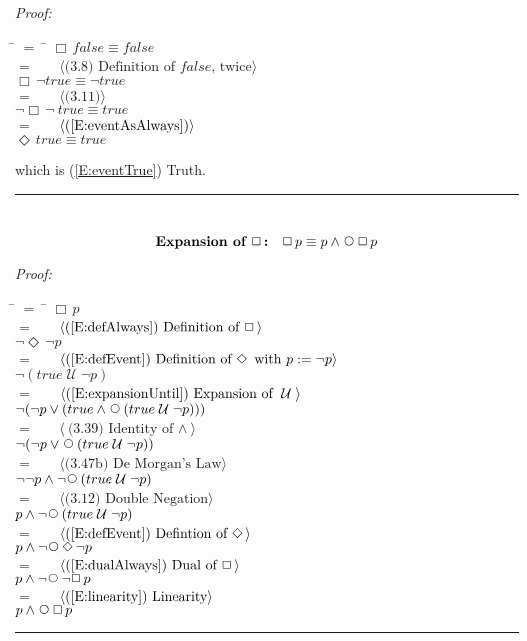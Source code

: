 \documentclass[fleqn, leqno]{article}
\newcommand{\lgap}{2pt} %
\newcommand{\mymathindent}{24pt} %
\newcommand{\Until}{\;\mathcal{U}\;}
\newcommand{\Next}{\;\,\text{\raisebox{3.5pt}{\circle{6}}}}
\newcommand{\Event}{\Diamond\,}
\newcommand{\Always}{\Box\,}
\newcommand{\myqed}{\hfill\rule[-.23ex]{1.2ex}{2.0ex}}
\newcommand{\Gll} {\langle} %
\newcommand{\Ggg} {\rangle} %
\newcommand{\Hint}[1] {\ \ \ $\Gll \mbox{#1} \Ggg$ } %
\begin{document}
\emph{Proof:}
\begin{tabbing}
\hspace{\mymathindent} \= $= \;$ \= \kill
\> \> $\Always false \equiv false$\\[\lgap]
\> $=$ \> \Hint{(3.8) Definition of $false$, twice}\\[\lgap]
\> \> $\Always\lnot true \equiv \lnot true$\\[\lgap]
\> $=$ \> \Hint{(3.11)}\\[\lgap]
\> \> $\lnot\Always\lnot\ true \equiv true$\\[\lgap]
\> $=$ \> \Hint{(\ref{E:eventAsAlways})}\\[\lgap]
\> \> $\Event true \equiv true$\\[\lgap]
\end{tabbing}
which is (\ref{E:eventTrue}) Truth. \myqed\\[\lgap]


\begin{equation}\label{E:expansionAlways}
\textbf{Expansion of $\Always$:}\quad \Always p \equiv p \land \Next\Always p
\end{equation}

\emph{Proof:}
\begin{tabbing}
\hspace{\mymathindent} \= $= \;$ \= \kill
\> \> $\Always p$\\[\lgap]
\> $=$ \> \Hint{(\ref{E:defAlways}) Definition of $\Always$}\\[\lgap]
\> \> $\lnot\Event\lnot p$\\[\lgap]
\> $=$ \> \Hint{(\ref{E:defEvent}) Definition of $\Event$ with $p := \lnot p$}\\[\lgap]
\> \> $\lnot(true \Until \lnot p)$\\[\lgap]
\> $=$ \> \Hint{(\ref{E:expansionUntil}) Expansion of $\Until$}\\[\lgap]
\> \> $\lnot(\lnot p \lor (true \land \Next(true \Until \lnot p)))$\\[\lgap]
\> $=$ \> \Hint{(3.39) Identity of $\land$}\\[\lgap]
\> \> $\lnot(\lnot p \lor \Next(true \Until \lnot p))$\\[\lgap]
\> $=$ \> \Hint{(3.47b) De Morgan's Law}\\[\lgap]
\> \> $\lnot\lnot p \land \lnot\Next(true \Until \lnot p)$\\[\lgap]
\> $=$ \> \Hint{(3.12) Double Negation}\\[\lgap]
\> \> $p \land \lnot\Next(true \Until \lnot p)$\\[\lgap]
\> $=$ \> \Hint{(\ref{E:defEvent}) Defintion of $\Event$}\\[\lgap]
\> \> $p \land \lnot\Next\Event\lnot p$\\[\lgap]
\> $=$ \> \Hint{(\ref{E:dualAlways}) Dual of $\Always$}\\[\lgap]
\> \> $p \land \lnot\Next\lnot\Always p$\\[\lgap]
\> $=$ \> \Hint{(\ref{E:linearity}) Linearity}\\[\lgap]
\> \> $p \land \Next\Always p$\\[\lgap]
\end{tabbing}
\myqed\\[\lgap]
\end{document}
